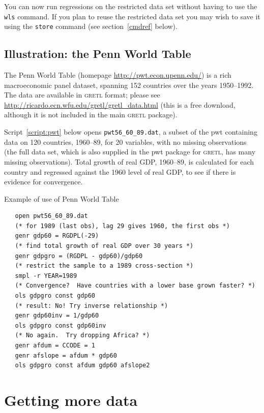 \documentclass{article}
\begin{document}
You can now run regressions on the restricted data set without having
to use the \texttt{wls} command.  If you plan to reuse the restricted
data set you may wish to save it using the \texttt{store} command (see
section~\ref{cmdref} below).

\subsection{Illustration: the Penn World Table}

The Penn World Table (homepage \url{http://pwt.econ.upenn.edu/}) is a
rich macroeconomic panel dataset, spanning 152 countries over the
years 1950--1992.  The data are available in \textsc{gretl} format;
please see \url{http://ricardo.ecn.wfu.edu/gretl/gretl_data.html} (this is
a free download, although it is not included in the main
\textsc{gretl} package).  

Script~\ref{script:pwt} below opens \texttt{pwt56\_60\_89.dat}, a
subset of the pwt containing data on 120 countries, 1960--89, for 20
variables, with no missing observations (the full data set, which is
also supplied in the pwt package for \textsc{gretl}, has many missing
observations).  Total growth of real GDP, 1960--89, is calculated for
each country and regressed against the 1960 level of real GDP, to see
if there is evidence for convergence.

\begin{script}[htbp]
\caption{Example of use of Penn World Table}
\label{script:pwt}
\begin{verbatim}
   open pwt56_60_89.dat
   (* for 1989 (last obs), lag 29 gives 1960, the first obs *)
   genr gdp60 = RGDPL(-29)
   (* find total growth of real GDP over 30 years *)
   genr gdpgro = (RGDPL - gdp60)/gdp60
   (* restrict the sample to a 1989 cross-section *)
   smpl -r YEAR=1989
   (* Convergence?  Have countries with a lower base grown faster? *)
   ols gdpgro const gdp60
   (* result: No! Try inverse relationship *)
   genr gdp60inv = 1/gdp60
   ols gdpgro const gdp60inv
   (* No again.  Try dropping Africa? *)
   genr afdum = CCODE = 1
   genr afslope = afdum * gdp60
   ols gdpgro const afdum gdp60 afslope2
\end{verbatim}
\end{script}

\section{Getting more data}
\label{sec:getting-more-data}
\end{document}
